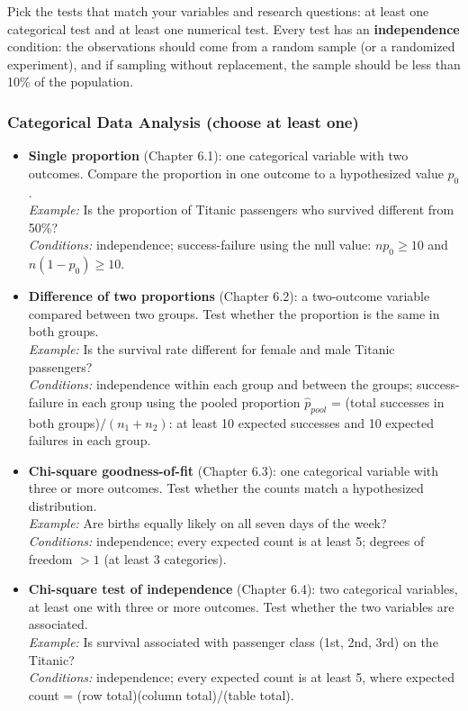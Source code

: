 
Pick the tests that match your variables and research questions: at least one categorical test and at least one numerical test.
Every test has an \textbf{independence} condition: the observations should come from a random sample (or a randomized experiment), and if sampling without replacement, the sample should be less than 10\% of the population.

\subsubsection*{Categorical Data Analysis (choose at least one)}
\begin{itemize}
    \item \textbf{Single proportion} (Chapter 6.1): one categorical variable with two outcomes. Compare the proportion in one outcome to a hypothesized value $p_0$.\\
    \emph{Example:} Is the proportion of Titanic passengers who survived different from 50\%?\\
    \emph{Conditions:} independence; success-failure using the null value: $np_0 \ge 10$ and $n(1-p_0) \ge 10$.
    \item \textbf{Difference of two proportions} (Chapter 6.2): a two-outcome variable compared between two groups. Test whether the proportion is the same in both groups.\\
    \emph{Example:} Is the survival rate different for female and male Titanic passengers?\\
    \emph{Conditions:} independence within each group and between the groups; success-failure in each group using the pooled proportion $\hat{p}_{pool}$ = (total successes in both groups)$/(n_1 + n_2)$: at least 10 expected successes and 10 expected failures in each group.
    \item \textbf{Chi-square goodness-of-fit} (Chapter 6.3): one categorical variable with three or more outcomes. Test whether the counts match a hypothesized distribution.\\
    \emph{Example:} Are births equally likely on all seven days of the week?\\
    \emph{Conditions:} independence; every expected count is at least 5; degrees of freedom $> 1$ (at least 3 categories).
    \item \textbf{Chi-square test of independence} (Chapter 6.4): two categorical variables, at least one with three or more outcomes. Test whether the two variables are associated.\\
    \emph{Example:} Is survival associated with passenger class (1st, 2nd, 3rd) on the Titanic?\\
    \emph{Conditions:} independence; every expected count is at least 5, where expected count = (row total)(column total)/(table total).
\end{itemize}

